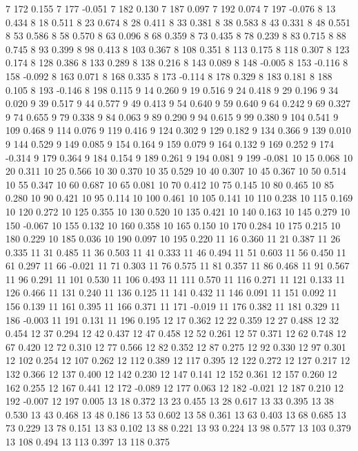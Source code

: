 7 172 0.155
7 177 -0.051
7 182 0.130
7 187 0.097
7 192 0.074
7 197 -0.076
8 13 0.434
8 18 0.511
8 23 0.674
8 28 0.411
8 33 0.381
8 38 0.583
8 43 0.331
8 48 0.551
8 53 0.586
8 58 0.570
8 63 0.096
8 68 0.359
8 73 0.435
8 78 0.239
8 83 0.715
8 88 0.745
8 93 0.399
8 98 0.413
8 103 0.367
8 108 0.351
8 113 0.175
8 118 0.307
8 123 0.174
8 128 0.386
8 133 0.289
8 138 0.216
8 143 0.089
8 148 -0.005
8 153 -0.116
8 158 -0.092
8 163 0.071
8 168 0.335
8 173 -0.114
8 178 0.329
8 183 0.181
8 188 0.105
8 193 -0.146
8 198 0.115
9 14 0.260
9 19 0.516
9 24 0.418
9 29 0.196
9 34 0.020
9 39 0.517
9 44 0.577
9 49 0.413
9 54 0.640
9 59 0.640
9 64 0.242
9 69 0.327
9 74 0.655
9 79 0.338
9 84 0.063
9 89 0.290
9 94 0.615
9 99 0.380
9 104 0.541
9 109 0.468
9 114 0.076
9 119 0.416
9 124 0.302
9 129 0.182
9 134 0.366
9 139 0.010
9 144 0.529
9 149 0.085
9 154 0.164
9 159 0.079
9 164 0.132
9 169 0.252
9 174 -0.314
9 179 0.364
9 184 0.154
9 189 0.261
9 194 0.081
9 199 -0.081
10 15 0.068
10 20 0.311
10 25 0.566
10 30 0.370
10 35 0.529
10 40 0.307
10 45 0.367
10 50 0.514
10 55 0.347
10 60 0.687
10 65 0.081
10 70 0.412
10 75 0.145
10 80 0.465
10 85 0.280
10 90 0.421
10 95 0.114
10 100 0.461
10 105 0.141
10 110 0.238
10 115 0.169
10 120 0.272
10 125 0.355
10 130 0.520
10 135 0.421
10 140 0.163
10 145 0.279
10 150 -0.067
10 155 0.132
10 160 0.358
10 165 0.150
10 170 0.284
10 175 0.215
10 180 0.229
10 185 0.036
10 190 0.097
10 195 0.220
11 16 0.360
11 21 0.387
11 26 0.335
11 31 0.485
11 36 0.503
11 41 0.333
11 46 0.494
11 51 0.603
11 56 0.450
11 61 0.297
11 66 -0.021
11 71 0.303
11 76 0.575
11 81 0.357
11 86 0.468
11 91 0.567
11 96 0.291
11 101 0.530
11 106 0.493
11 111 0.570
11 116 0.271
11 121 0.133
11 126 0.466
11 131 0.240
11 136 0.125
11 141 0.432
11 146 0.091
11 151 0.092
11 156 0.139
11 161 0.395
11 166 0.371
11 171 -0.019
11 176 0.382
11 181 0.329
11 186 -0.003
11 191 0.131
11 196 0.195
12 17 0.362
12 22 0.359
12 27 0.488
12 32 0.454
12 37 0.294
12 42 0.437
12 47 0.458
12 52 0.261
12 57 0.371
12 62 0.748
12 67 0.420
12 72 0.310
12 77 0.566
12 82 0.352
12 87 0.275
12 92 0.330
12 97 0.301
12 102 0.254
12 107 0.262
12 112 0.389
12 117 0.395
12 122 0.272
12 127 0.217
12 132 0.366
12 137 0.400
12 142 0.230
12 147 0.141
12 152 0.361
12 157 0.260
12 162 0.255
12 167 0.441
12 172 -0.089
12 177 0.063
12 182 -0.021
12 187 0.210
12 192 -0.007
12 197 0.005
13 18 0.372
13 23 0.455
13 28 0.617
13 33 0.395
13 38 0.530
13 43 0.468
13 48 0.186
13 53 0.602
13 58 0.361
13 63 0.403
13 68 0.685
13 73 0.229
13 78 0.151
13 83 0.102
13 88 0.221
13 93 0.224
13 98 0.577
13 103 0.379
13 108 0.494
13 113 0.397
13 118 0.375
